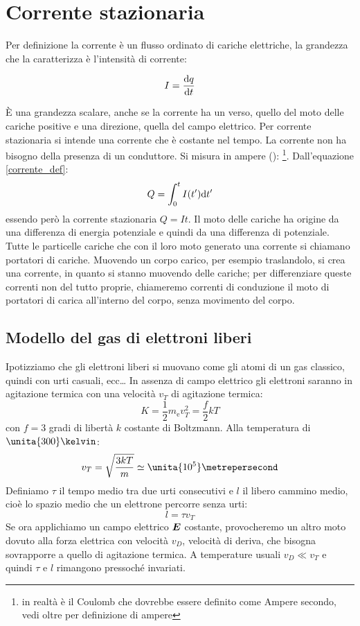 \chapter{Corrente stazionaria}
\minitoc
Per definizione la corrente è un flusso ordinato di cariche elettriche, la grandezza che la caratterizza è l'intensità di corrente:
\begin{Def}
\begin{equation}
I=\frac{\mathrm{d} q}{\mathrm{d} t}
\label{corrente_def}
\end{equation}
\end{Def}
\`E una grandezza scalare, anche se la corrente ha un verso, quello del moto delle cariche positive e una direzione, quella del campo elettrico. Per corrente stazionaria si intende una corrente che è costante nel tempo. La corrente non ha bisogno della presenza di un conduttore. Si misura in ampere (\ampere): \coulomb\per\second \footnote{in realtà è il Coulomb che dovrebbe essere definito come Ampere secondo, vedi oltre per definizione di ampere}. Dall'equazione \eqref{corrente_def}:
\begin{equation}
Q=\int_0^t I(t')\mathrm{d} t'
\end{equation}
essendo però la corrente stazionaria $Q=It$. Il moto delle cariche ha origine da una differenza di energia potenziale e quindi da una differenza di potenziale. Tutte le particelle cariche che con il loro moto generato una corrente si chiamano portatori di cariche. Muovendo un corpo carico, per esempio traslandolo, si crea una corrente, in quanto si stanno muovendo delle cariche; per differenziare queste correnti non del tutto proprie, chiameremo correnti di conduzione il moto di portatori di carica all'interno del corpo, senza movimento del corpo.
\section{Modello del gas di elettroni liberi}
Ipotizziamo che gli elettroni liberi si muovano come gli atomi di un gas classico, quindi con urti casuali, ecc\ldots
In assenza di campo elettrico gli elettroni saranno in agitazione termica con una velocità $v_T$ di agitazione termica:
\begin{equation*}K=\frac{1}{2}m_{\mathrm{e}}v_T^2=\frac{f}{2}kT\end{equation*}
con $f=3$ gradi di libertà  $k$ costante di Boltzmann. Alla temperatura di $\unita{300}\kelvin$:
\begin{equation*}v_T=\sqrt{\frac{3kT}{m}}\simeq \unita{10^5}\metrepersecond\end{equation*}
Definiamo $\tau$ il tempo medio tra due urti consecutivi e $l$ il libero cammino medio, cioè lo spazio medio che un elettrone percorre senza urti:
\begin{equation*}l = \tau v_T\end{equation*}
Se ora applichiamo un campo elettrico $\boldsymbol{E}$ costante, provocheremo un altro moto dovuto alla forza elettrica con velocità $v_D$, velocità di deriva, che bisogna sovrapporre a quello di agitazione termica. A temperature usuali $v_D\ll v_T$ e quindi $\tau$ e $l$ rimangono pressoché invariati.
